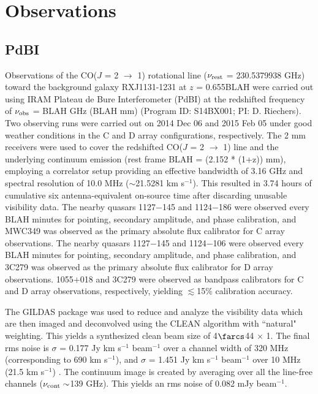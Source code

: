 \documentclass[]{emulateapj}
\begin{document}
\author{Draft}


\section{Observations}
\subsection{PdBI} \label{sec:PdBIdata}
Observations of the CO($J$ = 2 $\rightarrow$ 1) rotational line ($\nu_{\rm rest}$ = 230.5379938 GHz) toward the background galaxy RXJ1131-1231 at $z$ = 0.655BLAH
 were carried out using IRAM Plateau de Bure Interferometer (PdBI) at the redshifted frequency of $\nu_{\rm obs}$ = 
 BLAH GHz (BLAH mm) (Program ID: S14BX001; PI: D. Riechers). 
 Two observing runs were carried out on 2014 Dec 06 and 2015 Feb 05 under good
weather conditions in the C and D array configurations, respectively. The 2 mm receivers were used to cover the redshifted CO($J$ = 2 $\rightarrow$ 1) line and the underlying continuum emission (rest frame BLAH = (2.152 * (1+z)) mm), employing a correlator setup providing an effective bandwidth of 3.16 GHz and spectral resolution of 10.0 MHz ($\sim$21.5281 km s$^{-1}$).
This resulted in 3.74 hours of cumulative six antenna-equivalent on-source time 
after discarding unusable visibility data.
The nearby quasars 1127$-$145 and 1124$-$186 were observed every BLAH minutes for
pointing, secondary amplitude, and phase calibration, and MWC349 was observed as the primary
absolute flux calibrator for C array observations.
The nearby quasars 1127$-$145 and 1124$-$106 were observed every BLAH minutes for
pointing, secondary amplitude, and phase calibration, and 3C279 was observed as the primary
absolute flux calibrator for D array observations.
1055$+$018 and 3C279 were observed as bandpass calibrators for C and D array observations, respectively, yielding $\lesssim
$15\% calibration accuracy.

The GILDAS package was used to reduce and analyze the visibility data which are then imaged and deconvolved using
the CLEAN algorithm with ``natural" weighting. This yields a synthesized clean beam size of 4$\farcs$44 $\times$ 1. The final rms noise is $\sigma$ = 0.177 Jy km s$^{-1}$ beam$^{-1}$ over a channel width of 320 MHz (corresponding to 690 km s$^{-1}$), and $\sigma$ = 1.451 Jy km s$^{-1}$ beam$^{-1}$ over 10 MHz (21.5 km s$^{-1}$) . 
The continuum image is created by %
averaging over all the line-free channels ($\nu_{\rm cont}\sim$139 GHz). This yields an rms noise of 0.082 mJy beam$^{-1}$. %
\end{document}
